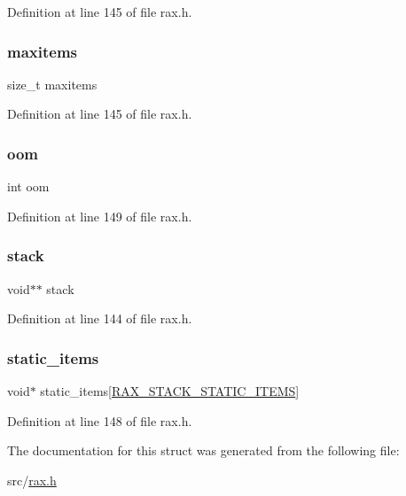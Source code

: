 Definition at line 145 of file rax.\+h.

\mbox{\label{structrax_stack_ab0e310064cc6a020cd4f1773760260a5}} 
\subsubsection{\texorpdfstring{maxitems}{maxitems}}
{\footnotesize\ttfamily size\+\_\+t maxitems}



Definition at line 145 of file rax.\+h.

\mbox{\label{structrax_stack_a7a989ca8ec18f6d21a77acc9cd90d595}} 
\subsubsection{\texorpdfstring{oom}{oom}}
{\footnotesize\ttfamily int oom}



Definition at line 149 of file rax.\+h.

\mbox{\label{structrax_stack_a1f13044ed8bc3e590b1658f295e312e6}} 
\subsubsection{\texorpdfstring{stack}{stack}}
{\footnotesize\ttfamily void$\ast$$\ast$ stack}



Definition at line 144 of file rax.\+h.

\mbox{\label{structrax_stack_a4c9a6441368d8681f82baf35dec33bbb}} 
\subsubsection{\texorpdfstring{static\+\_\+items}{static\_items}}
{\footnotesize\ttfamily void$\ast$ static\+\_\+items\mbox{[}\hyperlink{rax_8h_aff05c7893713f82d106c046f55ac1bf5}{R\+A\+X\+\_\+\+S\+T\+A\+C\+K\+\_\+\+S\+T\+A\+T\+I\+C\+\_\+\+I\+T\+E\+MS}\mbox{]}}



Definition at line 148 of file rax.\+h.



The documentation for this struct was generated from the following file\+:\begin{DoxyCompactItemize}
\item 
src/\hyperlink{rax_8h}{rax.\+h}\end{DoxyCompactItemize}
